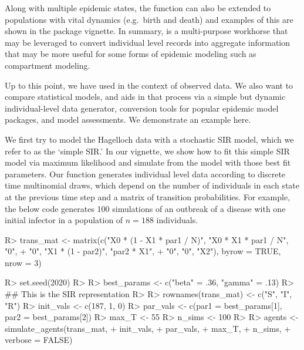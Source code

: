 \documentclass[
  shortnames]{jss}
\begin{document}
Along with multiple epidemic states, the function
 can also be extended to populations with
vital dynamics (e.g.~birth and death) and examples of this are shown in
the package vignette. In summary,  is a
multi-purpose workhorse that may be leveraged to convert individual
level records into aggregate information that may be more useful for
some forms of epidemic modeling such as compartment modeling.

Up to this point, we have used  in the context of
observed data. We also want to compare statistical models, and
 aids in that process via a simple but dynamic
individual-level data generator, conversion tools for popular epidemic
model packages, and model assessments. We demonstrate an example here.

We first try to model the Hagelloch data with a stochastic SIR model,
which we refer to as the `simple SIR.' In our vignette, we show how to
fit this simple SIR model via maximum likelihood and simulate from the
model with those best fit parameters. Our function
 generates individual level data according to
discrete time multinomial draws, which depend on the number of
individuals in each state at the previous time step and a matrix of
transition probabilities. For example, the below code generates 100
simulations of an outbreak of a disease with one initial infector in a
population of \(n= 188\) individuals.

\begin{CodeChunk}
\begin{CodeInput}
R> trans_mat <- matrix(c("X0 * (1 - X1 * par1 / N)", "X0 * X1  * par1 / N", "0",
+                   "0", "X1 * (1 - par2)", "par2 * X1",
+                   "0", "0", "X2"), byrow = TRUE, nrow = 3)
\end{CodeInput}
\end{CodeChunk}

\begin{CodeChunk}
\begin{CodeInput}
R> set.seed(2020)
R> 
R> best_params <- c("beta" = .36, "gamma" = .13)
R> ## This is the SIR representation
R> 
R> rownames(trans_mat) <- c("S", "I", "R")
R> init_vals <- c(187, 1, 0)
R> par_vals <- c(par1 = best_params[1], par2 = best_params[2])
R> max_T <- 55
R> n_sims <- 100
R> 
R> agents <- simulate_agents(trans_mat,
+                        init_vals,
+                        par_vals,
+                        max_T,
+                        n_sims,
+                        verbose = FALSE)
\end{CodeInput}
\end{CodeChunk}
\end{document}
